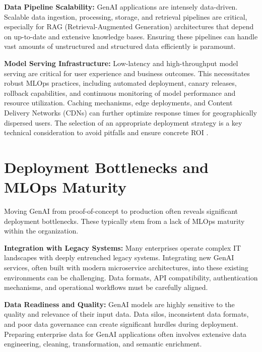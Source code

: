 \documentclass[10pt,journal,compsoc,twocolumn]{IEEEtran}
\begin{document}
\textbf{Data Pipeline Scalability:} GenAI applications are intensely data-driven. Scalable data ingestion, processing, storage, and retrieval pipelines are critical, especially for RAG (Retrieval-Augmented Generation) architectures that depend on up-to-date and extensive knowledge bases. Ensuring these pipelines can handle vast amounts of unstructured and structured data efficiently is paramount.

\textbf{Model Serving Infrastructure:} Low-latency and high-throughput model serving are critical for user experience and business outcomes. This necessitates robust MLOps practices, including automated deployment, canary releases, rollback capabilities, and continuous monitoring of model performance and resource utilization. Caching mechanisms, edge deployments, and Content Delivery Networks (CDNs) can further optimize response times for geographically dispersed users. The selection of an appropriate deployment strategy is a key technical consideration to avoid pitfalls and ensure concrete ROI \cite{openalex_w4400993506}.


\section{Deployment Bottlenecks and MLOps Maturity}


Moving GenAI from proof-of-concept to production often reveals significant deployment bottlenecks. These typically stem from a lack of MLOps maturity within the organization.

\textbf{Integration with Legacy Systems:} Many enterprises operate complex IT landscapes with deeply entrenched legacy systems. Integrating new GenAI services, often built with modern microservice architectures, into these existing environments can be challenging. Data formats, API compatibility, authentication mechanisms, and operational workflows must be carefully aligned.

\textbf{Data Readiness and Quality:} GenAI models are highly sensitive to the quality and relevance of their input data. Data silos, inconsistent data formats, and poor data governance can create significant hurdles during deployment. Preparing enterprise data for GenAI applications often involves extensive data engineering, cleaning, transformation, and semantic enrichment.
\end{document}
